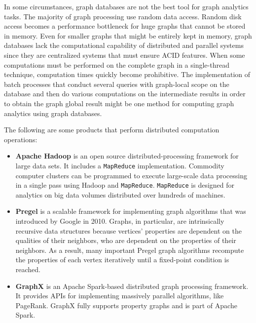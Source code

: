 In some circumstances, graph databases are not the best tool for graph analytics tasks.
The majority of graph processing use random data access.
Random disk access becomes a performance bottleneck for huge graphs that cannot be stored in memory.
Even for smaller graphs that might be entirely kept in memory, graph databases lack the computational capability of distributed and parallel systems since they are centralized systems that must ensure ACID features.
When some computations must be performed on the complete graph in a single-thread technique, computation times quickly become prohibitive.
The implementation of batch processes that conduct several queries with graph-local scope on the database and then do various computations on the intermediate results in order to obtain the graph global result might be one method for computing graph analytics using graph databases.

The following are some products that perform distributed computation operations:
 \begin{itemize}[noitemsep]
	\item \textbf{Apache Hadoop} is an open source distributed-processing framework for large data sets.
	It includes a \texttt{MapReduce} implementation.
	Commodity computer clusters can be programmed to execute large-scale data processing in a single pass using Hadoop and \texttt{MapReduce}.
	\texttt{MapReduce} is designed for analytics on big data volumes distributed over hundreds of machines.
	\item \textbf{\gls{Pregel}} is a scalable framework for implementing graph algorithms that was introduced by Google in 2010.
	Graphs, in particular, are intrinsically recursive data structures because vertices' properties are dependent on the qualities of their neighbors, who are dependent on the properties of their neighbors.
	As a result, many important \gls{Pregel} graph algorithms recompute the properties of each vertex iteratively until a fixed-point condition is reached.
	\item \textbf{GraphX} is an Apache Spark-based distributed graph processing framework.
	It provides \acrshort{API}s for implementing massively parallel algorithms, like PageRank.
	GraphX fully supports property graphs and is part of Apache Spark.
\end{itemize}

